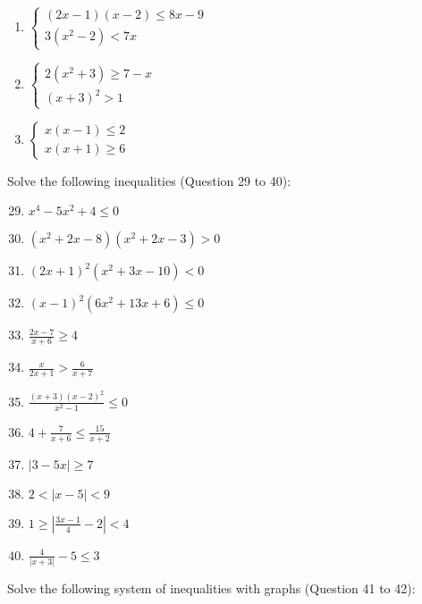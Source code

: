 \documentclass{report}
\begin{document}
\begin{multicols}{2}
\begin{enumerate}
        \item $\begin{cases}
                      (2x - 1)(x-2) \leq 8x - 9 \\
                      3(x^2 - 2) < 7x
                  \end{cases}$
        \item $\begin{cases}
                      2(x^2 + 3) \geq 7 - x \\
                      {(x+3)}^2 > 1
                  \end{cases}$
        \item $\begin{cases}
                      x(x-1) \leq 2 \\
                      x(x+1) \geq 6
                  \end{cases}$
    \end{enumerate}

    \noindent Solve the following inequalities (Question 29 to 40):

    \begin{enumerate}
        \setcounter{enumi}{28}
        \item $x^4 - 5x^2 + 4 \leq 0$
        \item $(x^2 + 2x - 8)(x^2 + 2x - 3) > 0$
        \item ${(2x + 1)}^2(x^2 + 3x - 10) < 0$
        \item ${(x-1)}^2(6x^2 + 13x + 6) \leq 0$
        \item $\frac{2x - 7}{x + 6} \geq 4$
        \item $\frac{x}{2x + 1} > \frac{6}{x + 7}$
        \item $\frac{(x+3){(x-2)}^2}{x^2 - 1} \leq 0$
        \item $4 + \frac{7}{x+6} \leq \frac{15}{x+2}$
        \item $|3 - 5x| \geq 7$
        \item $2 < |x-5| < 9$
        \item $1 \geq \left|\frac{3x - 1}{4} - 2\right| < 4$
        \item $\frac{4}{|x+3|} - 5 \leq 3$
    \end{enumerate}

    \noindent Solve the following system of inequalities with graphs (Question 41 to 42):


\end{multicols}
\end{document}
